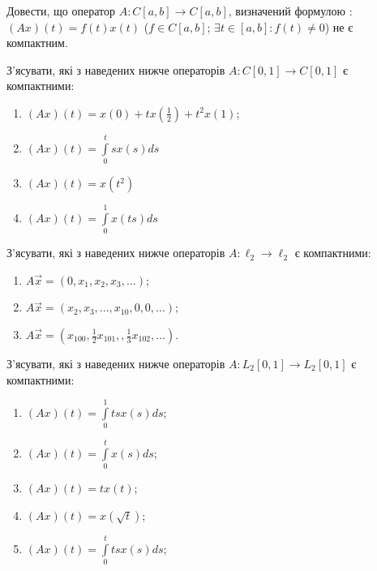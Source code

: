 
\begin{exercise}
    Довести, що оператор $A: C[a, b] \rightarrow C[a, b]$, визначений формулою : $(Ax)(t) = 
    f(t)x(t)$ ($f \in C[a, b]$; $\exists t \in [a, b] : f(t) \neq 0$) не є компактним.
\end{exercise}

\begin{exercise}
    З'ясувати, які з наведених нижче операторів $A : C[0, 1] \rightarrow C[0, 1]$ 
    є компактними:
    \begin{enumerate}
        \item $(Ax)(t) = x(0) + tx(\frac{1}{2}) + t^2 x(1)$;
        \item $(Ax)(t) = \int\limits_0^t sx(s) ds$
        \item $(Ax)(t) = x(t^2)$
        \item $(Ax)(t) = \int\limits_0^1 x(ts) ds$
    \end{enumerate}
\end{exercise}

\begin{exercise}
    З'ясувати, які з наведених нижче операторів $A : \ell_2 \rightarrow \ell_2$ 
    є компактними:
    \begin{enumerate}
        \item $A\vec{x} = (0, x_1, x_2, x_3, ...)$;
        \item $A\vec{x} = (x_2, x_3, ..., x_10, 0, 0, ...)$;
        \item $A\vec{x} = (x_{100}, \frac{1}{2}x_{101}, ,\frac{1}{3}x_102, ...)$.
    \end{enumerate}
\end{exercise}

\begin{exercise}
    З'ясувати, які з наведених нижче операторів $A : L_2[0, 1] \rightarrow L_2[0, 1]$ 
    є компактними:
    \begin{enumerate}
        \item $(Ax)(t) = \int\limits_0^1 tsx(s) ds$;
        \item $(Ax)(t) = \int\limits_0^t x(s) ds$;
        \item $(Ax)(t) = t x(t)$;
        \item $(Ax)(t) = x(\sqrt{t})$;
        \item $(Ax)(t) = \int\limits_0^t tsx(s) ds$;
    \end{enumerate}
\end{exercise}

